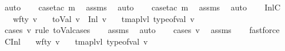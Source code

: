 \begin{isabellebody}
\ auto\isanewline
\ \ \isamarkupfalse%
\ {\isacharparenleft}{\kern0pt}case{\isacharunderscore}{\kern0pt}tac\ m{\isacharparenright}{\kern0pt}\ \isamarkupfalse%
\ assms\ \isamarkupfalse%
\ auto\isanewline
\ \ \isamarkupfalse%
\ {\isacharparenleft}{\kern0pt}case{\isacharunderscore}{\kern0pt}tac\ m{\isacharparenright}{\kern0pt}\ \isamarkupfalse%
\ assms\ \isamarkupfalse%
\ auto\isanewline
\ \ \isamarkupfalse%
%
\endisatagproof
{\isafoldproof}%
%
\isadelimproof
\isanewline
%
\endisadelimproof
\isanewline
{}\isamarkupfalse%
\ InlC{}{\isacharcolon}{\kern0pt}\isanewline
\ \ \ {\isachardoublequoteopen}wf{\isacharunderscore}{\kern0pt}ty\ v{\isachardoublequoteclose}\isanewline
\ \ \ {\isachardoublequoteopen}toVal{}{}{}{}\ v\ {\isacharequal}{\kern0pt}\ {\isacharparenleft}{\kern0pt}Inl\ v{\isacharprime}{\kern0pt}{\isacharparenright}{\kern0pt}{\isachardoublequoteclose}\isanewline
\ \ \ {\isachardoublequoteopen}tmap{\isacharunderscore}{\kern0pt}lvl\ {\isacharparenleft}{\kern0pt}type{\isacharunderscore}{\kern0pt}of{\isacharunderscore}{\kern0pt}val\ v{\isacharparenright}{\kern0pt}\ {\isacharequal}{\kern0pt}\ {}{\isachardoublequoteclose}\isanewline
%
\isadelimproof
\ \ %
\endisadelimproof
%
\isatagproof
{}\isamarkupfalse%
\ {\isacharparenleft}{\kern0pt}cases\ v\ rule{\isacharcolon}{\kern0pt}\ toVal{}{}{}{}{\isachardot}{\kern0pt}cases{\isacharparenright}{\kern0pt}\isanewline
\ \ \isamarkupfalse%
\ assms\ \isamarkupfalse%
\ auto\isanewline
\ \ \isamarkupfalse%
\ {\isacharparenleft}{\kern0pt}cases\ v{\isacharprime}{\kern0pt}{\isacharparenright}{\kern0pt}\ \isamarkupfalse%
\ assms\isanewline
\ \ \isamarkupfalse%
\ fastforce{\isacharplus}{\kern0pt}%
\endisatagproof
{\isafoldproof}%
%
\isadelimproof
\isanewline
%
\endisadelimproof
\isanewline
{}\isamarkupfalse%
\ C{}Inl{\isacharcolon}{\kern0pt}\isanewline
\ \ \ {\isachardoublequoteopen}wf{\isacharunderscore}{\kern0pt}ty\ v{\isachardoublequoteclose}\isanewline
\ \ \ {\isachardoublequoteopen}tmap{\isacharunderscore}{\kern0pt}lvl\ {\isacharparenleft}{\kern0pt}type{\isacharunderscore}{\kern0pt}of{\isacharunderscore}{\kern0pt}val\ v{\isacharparenright}{\kern0pt}\ {\isacharequal}{\kern0pt}\ {}{\isachardoublequoteclose}\isanewline

\end{isabellebody}
